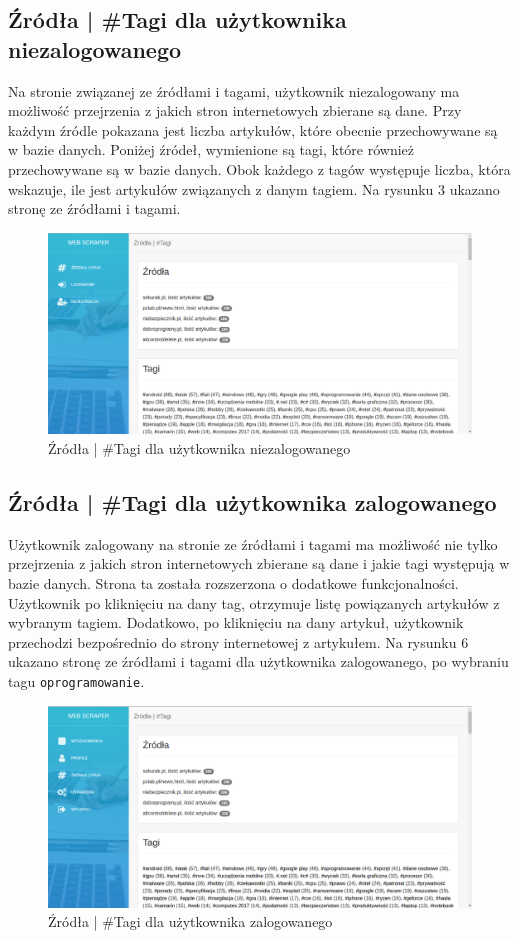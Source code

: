 \documentclass[12pt, titlepage]{article}
\begin{document}
	\newpage
	\subsection{Źródła | \#Tagi dla użytkownika niezalogowanego}
	Na stronie związanej ze źródłami i tagami, użytkownik niezalogowany ma możliwość przejrzenia z jakich stron internetowych zbierane są dane. Przy każdym źródle pokazana jest liczba artykułów, które obecnie przechowywane są w bazie danych. Poniżej źródeł, wymienione są tagi, które również przechowywane są w bazie danych. Obok każdego z tagów występuje liczba, która wskazuje, ile jest artykułów związanych z danym tagiem. Na rysunku 3 ukazano stronę ze źródłami i tagami.
	\begin{figure}[H]
		\centering
		\includegraphics[scale=0.40]{obrazki/niezalogowanyZrodla.png}
		\caption{Źródła | \#Tagi dla użytkownika niezalogowanego}
		\label{fig:db_schema}
	\end{figure}
	
	\newpage
	\subsection{Źródła | \#Tagi dla użytkownika zalogowanego}
	Użytkownik zalogowany na stronie ze źródłami i tagami ma możliwość nie tylko przejrzenia z jakich stron internetowych zbierane są dane i jakie tagi występują w bazie danych. Strona ta została rozszerzona o dodatkowe funkcjonalności. Użytkownik po kliknięciu na dany tag, otrzymuje listę powiązanych artykułów  z wybranym tagiem. Dodatkowo, po kliknięciu na dany artykuł, użytkownik przechodzi bezpośrednio do strony internetowej z artykułem. Na rysunku 6 ukazano stronę ze źródłami i tagami dla użytkownika zalogowanego, po wybraniu tagu \texttt{oprogramowanie}.
	\begin{figure}[H]
		\centering
		\includegraphics[scale=0.40]{obrazki/zalogowanyZrodla.png}
		\caption{Źródła | \#Tagi dla użytkownika zalogowanego}
		\label{fig:db_schema}
	\end{figure}
	
\end{document}
